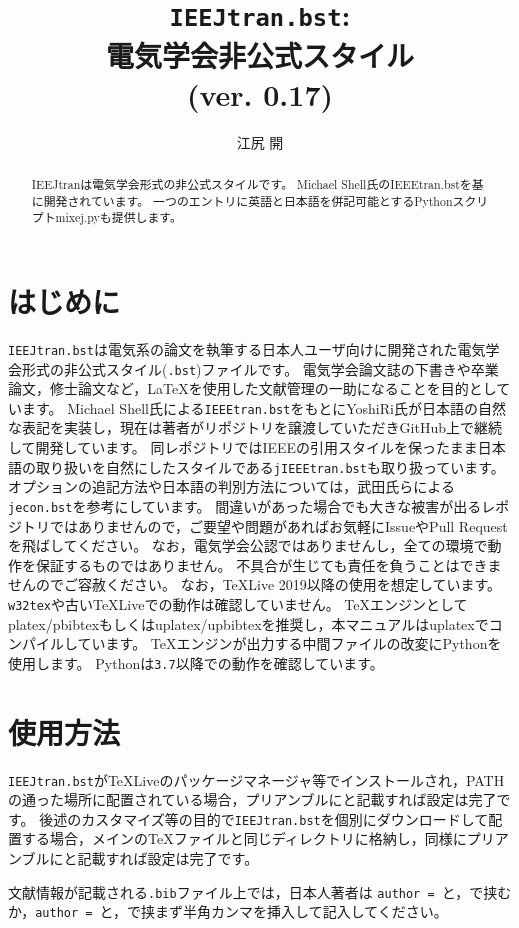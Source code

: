 \documentclass[11pt, a4paper, dvipdfmx, uplatex]{jsarticle}
\title{\texttt{IEEJtran.bst}:\\電気学会非公式\BibTeX スタイル\\(ver. 0.17)}
\author{江尻 開}
\begin{document}
\maketitle

\begin{abstract}
IEEJtranは電気学会形式の非公式\BibTeX スタイルです。
Michael Shell氏のIEEEtran.bstを基に開発されています。
一つのエントリに英語と日本語を併記可能とするPythonスクリプトmixej.pyも提供します。
\end{abstract}


\section{はじめに}

\texttt{IEEJtran.bst}は電気系の論文を執筆する日本人ユーザ向けに開発された電気学会形式の非公式\BibTeX スタイル(\texttt{.bst})ファイルです。
電気学会論文誌の下書きや卒業論文，修士論文など，\LaTeX を使用した文献管理の一助になることを目的としています。
Michael Shell氏による\texttt{IEEEtran.bst}\cite{IEEEtran}をもとにYoshiRi氏が日本語の自然な表記を実装し，現在は著者がリポジトリを譲渡していただきGitHub上\cite{jIEEEtran}で継続して開発しています。
同レポジトリではIEEEの引用スタイルを保ったまま日本語の取り扱いを自然にした\BibTeX スタイルである\texttt{jIEEEtran.bst}も取り扱っています。
オプションの追記方法や日本語の判別方法については，武田氏らによる\texttt{jecon.bst}\cite{jeconbst}を参考にしています。
間違いがあった場合でも大きな被害が出るレポジトリではありませんので，ご要望や問題があればお気軽にIssueやPull Requestを飛ばしてください。
なお，電気学会公認ではありませんし，全ての環境で動作を保証するものではありません。
不具合が生じても責任を負うことはできませんのでご容赦ください。
なお，\TeX Live 2019以降の使用を想定しています。
\texttt{w32tex}や古い\TeX Liveでの動作は確認していません。
\TeX エンジンとしてplatex/pbibtexもしくはuplatex/upbibtexを推奨し，本マニュアルはuplatexでコンパイルしています。
\TeX エンジンが出力する中間ファイルの改変にPythonを使用します。
Pythonは\texttt{3.7}以降での動作を確認しています。


\section{使用方法}

\texttt{IEEJtran.bst}が\TeX Liveのパッケージマネージャ等でインストールされ，PATHの通った場所に配置されている場合，プリアンブルに\texttt{\string{}}と記載すれば設定は完了です。
後述のカスタマイズ等の目的で\texttt{IEEJtran.bst}を個別にダウンロードして配置する場合，メインの\TeX ファイルと同じディレクトリに格納し，同様にプリアンブルに\texttt{\string{}}と記載すれば設定は完了です。

文献情報が記載される\texttt{.bib}ファイル上では，日本人著者は
\texttt{author = }と，\texttt{\string{\string}}で挟むか，\texttt{author = }と，\texttt{\string{\string}}で挟まず半角カンマを挿入して記入してください。
\end{document}
